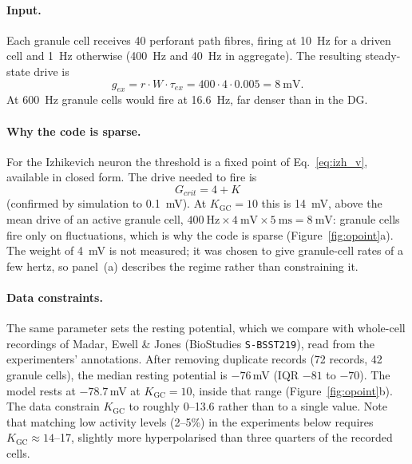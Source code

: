 \documentclass[11pt,a4paper]{article}
\newcommand{\Kgc}{K_{\mathrm{GC}}}
\begin{document}
\paragraph{Input.} Each granule cell receives 40 perforant path fibres, firing at
\SI{10}{\hertz} for a driven cell and \SI{1}{\hertz} otherwise (\SI{400}{\hertz}
and \SI{40}{\hertz} in aggregate). The resulting steady-state drive is
\begin{equation}
  g_{ex} = r \cdot W \cdot \tau_{ex} = 400 \cdot 4 \cdot 0.005 = \SI{8}{\milli\volt}.
  \label{eq:gex}
\end{equation}
At \SI{600}{\hertz} granule cells would fire at \SI{16.6}{\hertz}, far denser
than in the DG.

\paragraph{Why the code is sparse.} For the Izhikevich neuron the threshold is a
fixed point of Eq.~\eqref{eq:izh_v}, available in closed form. The drive needed to
fire is
\begin{equation}
  G_{crit} = 4 + K
  \label{eq:gcrit}
\end{equation}
(confirmed by simulation to \SI{0.1}{\milli\volt}). At $\Kgc=10$ this is
\SI{14}{\milli\volt}, above the mean drive of an active granule cell,
$\SI{400}{\hertz}\times\SI{4}{\milli\volt}\times\SI{5}{\milli\second}
=\SI{8}{\milli\volt}$: granule cells fire only on fluctuations, which is why the
code is sparse (Figure~\ref{fig:opoint}a). The weight of \SI{4}{\milli\volt} is
not measured; it was chosen to give granule-cell rates of a few hertz, so panel~(a)
describes the regime rather than constraining it.

\paragraph{Data constraints.} The same parameter sets the resting potential, which
we compare with whole-cell recordings of Madar, Ewell \& Jones \cite{madar2019}
(BioStudies \texttt{S-BSST219}), read from the experimenters' annotations. After
removing duplicate records (72 records, 42 granule cells), the median resting
potential is $-76$\,mV (IQR $-81$ to $-70$). The model rests at $-78.7$\,mV at
$\Kgc=10$, inside that range (Figure~\ref{fig:opoint}b). The data constrain
$\Kgc$ to roughly 0--13.6 rather than to a single value. Note that matching low
activity levels (2--5\%) in the experiments below requires $\Kgc\approx14$--17,
slightly more hyperpolarised than three quarters of the recorded cells.
\end{document}

